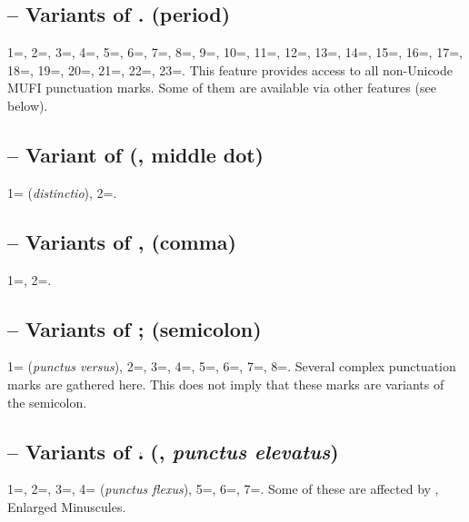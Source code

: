 \subsection{ –
  Variants of . (period)}
1=, 2=, 3=, 4=, 5=, 6=,
7=, 8=, 9=, 10=, 11=, 12=,
13=, 14=, 15=, 16=, 17=,
18=, 19=, 20=, 21=, 22=,
23=. This feature provides access to all non-Unicode MUFI punctuation marks. Some of them
are available via other features (see below).

\subsection{ – Variant of {\textperiodcentered} (, middle dot)}
1= (\textit{distinctio}), 2=.

\subsection{ –
Variants of , (comma)}
1=, 2=.

\subsection{ –
Variants of ; (semicolon)}
1= (\textit{punctus versus}), 2=, 3=, 4=,
5=, 6=, 7=, 8=. Several complex
punctuation marks are gathered here. This does not imply that these marks are variants of
the semicolon.

\subsection{ – Variants of ⹎ (, \textit{punctus elevatus})}
1=, 2=, 3=, 4= (\textit{punctus flexus}),
5=, 6=, 7=. Some of these are affected by ,
Enlarged Minuscules.

